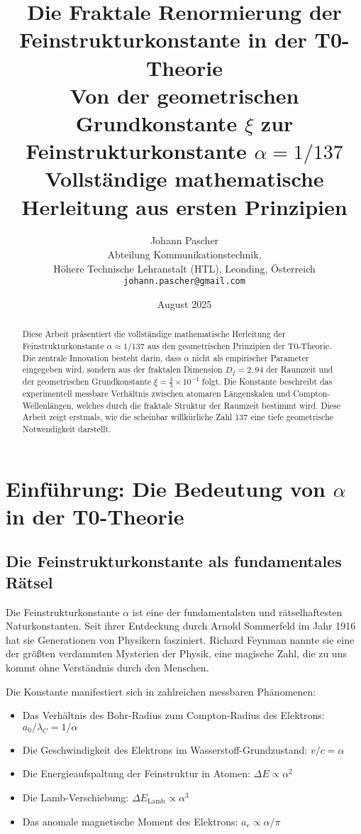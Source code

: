 \documentclass[12pt,a4paper]{article}
\title{\textbf{Die Fraktale Renormierung der Feinstrukturkonstante in der T0-Theorie}\\[0.5cm]
	\large Von der geometrischen Grundkonstante $\xi$ zur Feinstrukturkonstante $\alpha = 1/137$\\[0.3cm]
	\normalsize Vollständige mathematische Herleitung aus ersten Prinzipien}
\author{Johann Pascher\\
	\small Abteilung Kommunikationstechnik,\\
	\small Höhere Technische Lehranstalt (HTL), Leonding, Österreich\\
	\small \texttt{johann.pascher@gmail.com}}
\date{August 2025}
\theoremstyle{definition}
\begin{document}
	
	\maketitle
	
	\begin{abstract}
		Diese Arbeit präsentiert die vollständige mathematische Herleitung der Feinstrukturkonstante $\alpha \approx 1/137$ aus den geometrischen Prinzipien der T0-Theorie. Die zentrale Innovation besteht darin, dass $\alpha$ nicht als empirischer Parameter eingegeben wird, sondern aus der fraktalen Dimension $D_f = 2{,}94$ der Raumzeit und der geometrischen Grundkonstante $\xi = \frac{4}{3} \times 10^{-4}$ folgt. Die Konstante beschreibt das experimentell messbare Verhältnis zwischen atomaren Längenskalen und Compton-Wellenlängen, welches durch die fraktale Struktur der Raumzeit bestimmt wird. Diese Arbeit zeigt erstmals, wie die scheinbar willkürliche Zahl 137 eine tiefe geometrische Notwendigkeit darstellt.
	\end{abstract}
	
	\tableofcontents
	\newpage
	
	\section{Einführung: Die Bedeutung von $\alpha$ in der T0-Theorie}
	
	\subsection{Die Feinstrukturkonstante als fundamentales Rätsel}
	
	Die Feinstrukturkonstante $\alpha$ ist eine der fundamentalsten und rätselhaftesten Naturkonstanten. Seit ihrer Entdeckung durch Arnold Sommerfeld im Jahr 1916 hat sie Generationen von Physikern fasziniert. Richard Feynman nannte sie eine der größten verdammten Mysterien der Physik, eine magische Zahl, die zu uns kommt ohne Verständnis durch den Menschen.
	
	Die Konstante manifestiert sich in zahlreichen messbaren Phänomenen:
	\begin{itemize}
		\item Das Verhältnis des Bohr-Radius zum Compton-Radius des Elektrons: $a_0/\lambda_C = 1/\alpha$
		\item Die Geschwindigkeit des Elektrons im Wasserstoff-Grundzustand: $v/c = \alpha$
		\item Die Energieaufspaltung der Feinstruktur in Atomen: $\Delta E \propto \alpha^2$
		\item Die Lamb-Verschiebung: $\Delta E_{\text{Lamb}} \propto \alpha^3$
		\item Das anomale magnetische Moment des Elektrons: $a_e \propto \alpha/\pi$
	\end{itemize}
	
\end{document}
